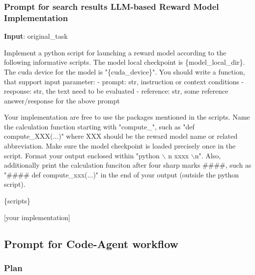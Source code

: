 \subsubsection{Prompt for search results LLM-based Reward Model Implementation}  
\label{apd:implement_prompt}


\begin{tcolorbox}[title = {Reward Tool Implementation}, breakable, colframe=blue!50!black, colback=blue!10]
\textbf{Input}: original\_task
\tcblower


Implement a python script for launching a reward model according to the following informative scripts. The model local checkpoint is \{model\_local\_dir\}. The cuda device for the model is "\{cuda\_device\}". You should write a function, that support input parameter:
- prompt: str, instruction or context conditions
- response: str, the text need to be evaluated
- reference: str, some reference answer/response for the above prompt

Your implementation are free to use the packages mentioned in the scripts. Name the calculation function starting with "compute\_", such as "def compute\_XXX(...)" where XXX should be the reward model name or related abbreviation. Make sure the model checkpoint is loaded precisely once in the script. Format your output enclosed within "python $\backslash$ n xxxx $\backslash$n". Also, additionally print the calculation funciton after four sharp marks \#\#\#\#, such as "\#\#\#\# def compute\_xxx(...)" in the end of your output (outside the python script).

\{scripts\}

[your implementation]

\end{tcolorbox}



\subsection{Prompt for Code-Agent workflow}

\subsubsection{Plan} \label{sec:code-agent-plan}


